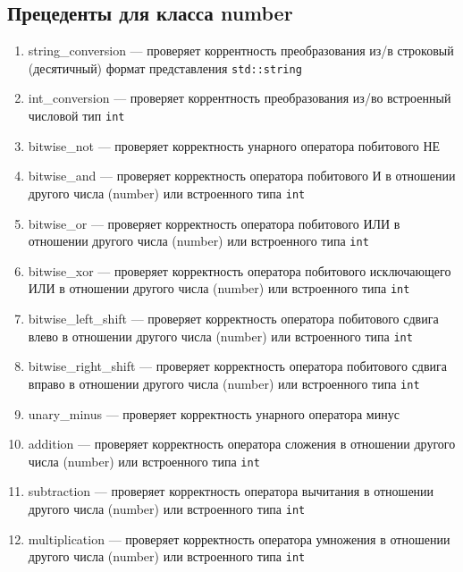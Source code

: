 \documentclass[a4paper,12pt]{article}
\begin{document}
\subsection{Прецеденты для класса number}

\begin{enumerate}

\item string\_conversion — проверяет коррентность преобразования из/в строковый (десятичный) формат представления \verb!std::string!

\item int\_conversion — проверяет коррентность преобразования из/во встроенный числовой тип \verb!int!

\item bitwise\_not — проверяет корректность унарного оператора побитового НЕ

\item bitwise\_and — проверяет корректность оператора побитового И в отношении другого числа (number) или встроенного типа \verb!int!

\item bitwise\_or — проверяет корректность оператора побитового ИЛИ в отношении другого числа (number) или встроенного типа \verb!int!

\item bitwise\_xor — проверяет корректность оператора побитового исключающего ИЛИ в отношении другого числа (number) или встроенного типа \verb!int!

\item bitwise\_left\_shift — проверяет корректность оператора побитового сдвига влево в отношении другого числа (number) или встроенного типа \verb!int!

\item bitwise\_right\_shift — проверяет корректность оператора побитового сдвига вправо в отношении другого числа (number) или встроенного типа \verb!int!

\item unary\_minus — проверяет корректность унарного оператора минус

\item addition — проверяет корректность оператора сложения в отношении другого числа (number) или встроенного типа \verb!int!

\item subtraction — проверяет корректность оператора вычитания в отношении другого числа (number) или встроенного типа \verb!int!

\item multiplication — проверяет корректность оператора умножения в отношении другого числа (number) или встроенного типа \verb!int!


\end{enumerate}
\end{document}
